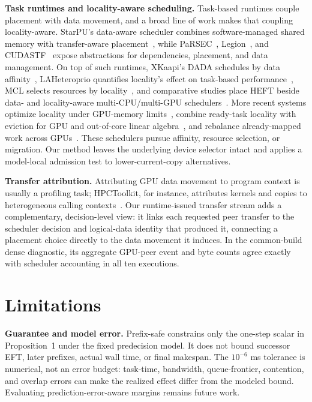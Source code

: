 \documentclass[sigconf]{acmart}
\begin{document}
\textbf{Task runtimes and locality-aware scheduling.} Task-based runtimes couple placement with data movement, and a broad line of work makes that coupling locality-aware. StarPU's data-aware scheduler combines software-managed shared memory with transfer-aware placement~\citep{augonnet2010dataaware,augonnet2011starpu}, while PaRSEC~\citep{bosilca2013parsec}, Legion~\citep{bauer2012legion}, and CUDASTF~\citep{augonnet2024cudastf} expose abstractions for dependencies, placement, and data management. On top of such runtimes, XKaapi's DADA schedules by data affinity~\citep{bleuse2014dada}, LAHeteroprio quantifies locality's effect on task-based performance~\citep{bramas2019lahp}, MCL selects resources by locality~\citep{kamatar2020locality}, and comparative studies place HEFT beside data- and locality-aware multi-CPU/multi-GPU schedulers~\citep{lima2015strategies}. More recent systems optimize locality under GPU-memory limits~\citep{gonthier2023taming}, combine ready-task locality with eviction for GPU and out-of-core linear algebra~\citep{gonthier2025darts}, and rebalance already-mapped work across GPUs~\citep{john2024multigpu}. These schedulers pursue affinity, resource selection, or migration. Our method leaves the underlying device selector intact and applies a model-local admission test to lower-current-copy alternatives.

\textbf{Transfer attribution.} Attributing GPU data movement to program context is usually a profiling task; HPCToolkit, for instance, attributes kernels and copies to heterogeneous calling contexts~\citep{zhou2021hpctoolkit}. Our runtime-issued transfer stream adds a complementary, decision-level view: it links each requested peer transfer to the scheduler decision and logical-data identity that produced it, connecting a placement choice directly to the data movement it induces. In the common-build dense diagnostic, its aggregate GPU-peer event and byte counts agree exactly with scheduler accounting in all ten executions.

\section{Limitations}\label{sec:limitations}

\textbf{Guarantee and model error.} Prefix-safe constrains only the one-step scalar in Proposition~1 under the fixed predecision model. It does not bound successor EFT, later prefixes, actual wall time, or final makespan. The \(10^{-6}\) ms tolerance is numerical, not an error budget: task-time, bandwidth, queue-frontier, contention, and overlap errors can make the realized effect differ from the modeled bound. Evaluating prediction-error-aware margins remains future work.
\end{document}
